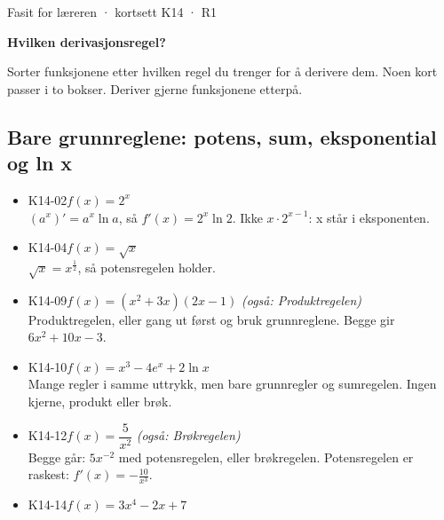 \documentclass[11pt,a4paper]{article}
\begin{document}
\begin{minipage}[t]{0.8\linewidth}\vspace{0pt}
{\sffamily\small\color{dempet}Fasit for læreren · kortsett K14 · R1}\par\vspace{0.25em}
{\fontsize{20}{24}\selectfont\bfseries Hvilken derivasjonsregel?}\par\vspace{0.5em}
Sorter funksjonene etter hvilken regel du trenger for å derivere dem. Noen kort passer i to bokser. Deriver gjerne funksjonene etterpå.\par{}
\end{minipage}\hfill
\begin{minipage}[t]{0.15\linewidth}\vspace{0pt}\raggedleft
{}
\end{minipage}\par\vspace{0.8em}

\subsection*{Bare grunnreglene: potens, sum, eksponential og ln x}
\begin{itemize}[leftmargin=1.2em, itemsep=0.35em]
\item \textsf{\small K14-02}\quad $f(x) = 2^x$\\{\small\color{dempet}$(a^x)' = a^x \ln a$, så $f'(x) = 2^x \ln 2$. Ikke $x \cdot 2^{x-1}$: x står i eksponenten.}
\item \textsf{\small K14-04}\quad $f(x) = \sqrt{x}$\\{\small\color{dempet}$\sqrt{x} = x^{\frac{1}{2}}$, så potensregelen holder.}
\item \textsf{\small K14-09}\quad $f(x) = (x^2 + 3x)(2x - 1)$ \emph{(også: Produktregelen)}\\{\small\color{dempet}Produktregelen, eller gang ut først og bruk grunnreglene. Begge gir $6x^2 + 10x - 3$.}
\item \textsf{\small K14-10}\quad $f(x) = x^3 - 4e^x + 2\ln x$\\{\small\color{dempet}Mange regler i samme uttrykk, men bare grunnregler og sumregelen. Ingen kjerne, produkt eller brøk.}
\item \textsf{\small K14-12}\quad $f(x) = \dfrac{5}{x^2}$ \emph{(også: Brøkregelen)}\\{\small\color{dempet}Begge går: $5x^{-2}$ med potensregelen, eller brøkregelen. Potensregelen er raskest: $f'(x) = -\frac{10}{x^3}$.}
\item \textsf{\small K14-14}\quad $f(x) = 3x^4 - 2x + 7$
\end{itemize}
\end{document}
